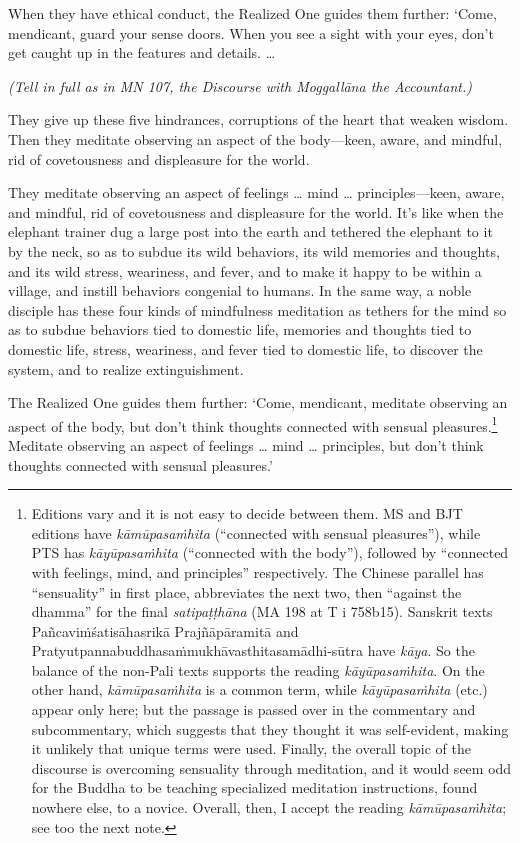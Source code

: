 \documentclass[12pt,openany]{book}%
\newcommand*{\scexpansioninstructions}[1]{\begin{small}\textit{#1}\end{small}}
\begin{document}
When they have ethical conduct, the Realized One guides them further: ‘Come, mendicant, guard your sense doors. When you see a sight with your eyes, don’t get caught up in the features and details. … 

\scexpansioninstructions{(Tell in full as in MN 107, the Discourse with \textsanskrit{Moggallāna} the Accountant.) }

They give up these five hindrances, corruptions of the heart that weaken wisdom. Then they meditate observing an aspect of the body—keen, aware, and mindful, rid of covetousness and displeasure for the world. 

They meditate observing an aspect of feelings … mind … principles—keen, aware, and mindful, rid of covetousness and displeasure for the world. It’s like when the elephant trainer dug a large post into the earth and tethered the elephant to it by the neck, so as to subdue its wild behaviors, its wild memories and thoughts, and its wild stress, weariness, and fever, and to make it happy to be within a village, and instill behaviors congenial to humans. In the same way, a noble disciple has these four kinds of mindfulness meditation as tethers for the mind so as to subdue behaviors tied to domestic life, memories and thoughts tied to domestic life, stress, weariness, and fever tied to domestic life, to discover the system, and to realize extinguishment. 

The Realized One guides them further: ‘Come, mendicant, meditate observing an aspect of the body, but don’t think thoughts connected with sensual pleasures.\footnote{Editions vary and it is not easy to decide between them. MS and BJT editions have \textit{\textsanskrit{kāmūpasaṁhita}} (“connected with sensual pleasures”), while PTS has \textit{\textsanskrit{kāyūpasaṁhita}} (“connected with the body”), followed by “connected with feelings, mind, and principles” respectively. The Chinese parallel has “sensuality” in first place, abbreviates the next two, then “against the dhamma” for the final \textit{\textsanskrit{satipaṭṭhāna}} (MA 198 at T i 758b15). Sanskrit texts \textsanskrit{Pañcaviṁśatisāhasrikā} \textsanskrit{Prajñāpāramitā} and \textsanskrit{Pratyutpannabuddhasaṁmukhāvasthitasamādhi}-\textsanskrit{sūtra} have \textit{\textsanskrit{kāya}}. So the balance of the non-Pali texts supports the reading \textit{\textsanskrit{kāyūpasaṁhita}}. On the other hand, \textit{\textsanskrit{kāmūpasaṁhita}} is a common term, while \textit{\textsanskrit{kāyūpasaṁhita}} (etc.) appear only here; but the passage is passed over in the commentary and subcommentary, which suggests that they thought it was self-evident, making it unlikely that unique terms were used. Finally, the overall topic of the discourse is overcoming sensuality through meditation, and it would seem odd for the Buddha to be teaching specialized meditation instructions, found nowhere else, to a novice. Overall, then, I accept the reading \textit{\textsanskrit{kāmūpasaṁhita}}; see too the next note. } Meditate observing an aspect of feelings … mind … principles, but don’t think thoughts connected with sensual pleasures.’ 
\end{document}
